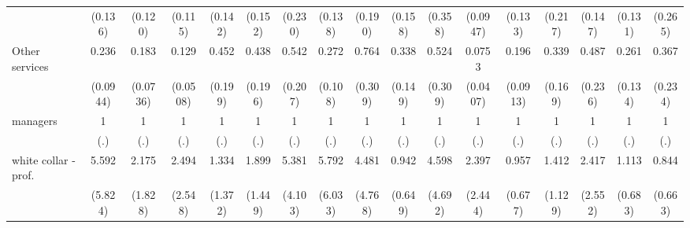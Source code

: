 {\begin{tabular}{l*{16}{c}}
                    &     (0.136)         &     (0.120)         &     (0.115)         &     (0.142)         &     (0.152)         &     (0.230)         &     (0.138)         &     (0.190)         &     (0.158)         &     (0.358)         &    (0.0947)         &     (0.133)         &     (0.217)         &     (0.147)         &     (0.131)         &     (0.265)         \\
[1em]
Other services      &       0.236\sym{***}&       0.183\sym{***}&       0.129\sym{***}&       0.452         &       0.438         &       0.542         &       0.272\sym{**} &       0.764         &       0.338\sym{*}  &       0.524         &      0.0753\sym{***}&       0.196\sym{***}&       0.339\sym{*}  &       0.487         &       0.261\sym{**} &       0.367         \\
                    &    (0.0944)         &    (0.0736)         &    (0.0508)         &     (0.199)         &     (0.196)         &     (0.207)         &     (0.108)         &     (0.309)         &     (0.149)         &     (0.309)         &    (0.0407)         &    (0.0913)         &     (0.169)         &     (0.236)         &     (0.134)         &     (0.234)         \\
[1em]
managers            &           1         &           1         &           1         &           1         &           1         &           1         &           1         &           1         &           1         &           1         &           1         &           1         &           1         &           1         &           1         &           1         \\
                    &         (.)         &         (.)         &         (.)         &         (.)         &         (.)         &         (.)         &         (.)         &         (.)         &         (.)         &         (.)         &         (.)         &         (.)         &         (.)         &         (.)         &         (.)         &         (.)         \\
[1em]
white collar - prof.&       5.592         &       2.175         &       2.494         &       1.334         &       1.899         &       5.381\sym{*}  &       5.792         &       4.481         &       0.942         &       4.598         &       2.397         &       0.957         &       1.412         &       2.417         &       1.113         &       0.844         \\
                    &     (5.824)         &     (1.828)         &     (2.548)         &     (1.372)         &     (1.449)         &     (4.103)         &     (6.033)         &     (4.768)         &     (0.649)         &     (4.692)         &     (2.444)         &     (0.677)         &     (1.129)         &     (2.552)         &     (0.683)         &     (0.663)         \\

\end{tabular}}
